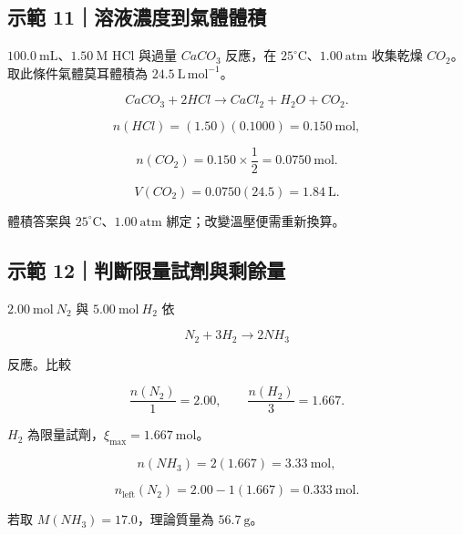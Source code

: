 \documentclass[11pt,a4paper]{article}
\begin{document}
\begin{HandoutWorkedExample}

\subsection{示範 11｜溶液濃度到氣體體積}\label{ux793aux7bc4-11ux6eb6ux6db2ux6fc3ux5ea6ux5230ux6c23ux9ad4ux9ad4ux7a4d}

\(100.0\ \mathrm{mL}\)、\(1.50\ \mathrm M\) HCl 與過量 \(CaCO_3\) 反應，在 \(25^\circ\mathrm C\)、\(1.00\ \mathrm{atm}\) 收集乾燥 \(CO_2\)。取此條件氣體莫耳體積為 \(24.5\ \mathrm{L\,mol^{-1}}\)。

\[
CaCO_3+2HCl\rightarrow CaCl_2+H_2O+CO_2.
\]

\[
n(HCl)=(1.50)(0.1000)=0.150\ \mathrm{mol},
\]

\[
n(CO_2)=0.150\times\frac12=0.0750\ \mathrm{mol}.
\]

\[
V(CO_2)=0.0750(24.5)=1.84\ \mathrm L.
\]

體積答案與 \(25^\circ\mathrm C\)、\(1.00\ \mathrm{atm}\) 綁定；改變溫壓便需重新換算。

\end{HandoutWorkedExample}

\begin{HandoutWorkedExample}

\subsection{示範 12｜判斷限量試劑與剩餘量}\label{ux793aux7bc4-12ux5224ux65b7ux9650ux91cfux8a66ux5291ux8207ux5269ux9918ux91cf}

\(2.00\ \mathrm{mol}\ N_2\) 與 \(5.00\ \mathrm{mol}\ H_2\) 依

\[
N_2+3H_2\rightarrow2NH_3
\]

反應。比較

\[
\frac{n(N_2)}1=2.00,
\qquad
\frac{n(H_2)}3=1.667.
\]

\(H_2\) 為限量試劑，\(\xi_{\max}=1.667\ \mathrm{mol}\)。

\[
n(NH_3)=2(1.667)=3.33\ \mathrm{mol},
\]

\[
n_{\mathrm{left}}(N_2)=2.00-1(1.667)=0.333\ \mathrm{mol}.
\]

若取 \(M(NH_3)=17.0\)，理論質量為 \(56.7\ \mathrm g\)。

\end{HandoutWorkedExample}
\end{document}

